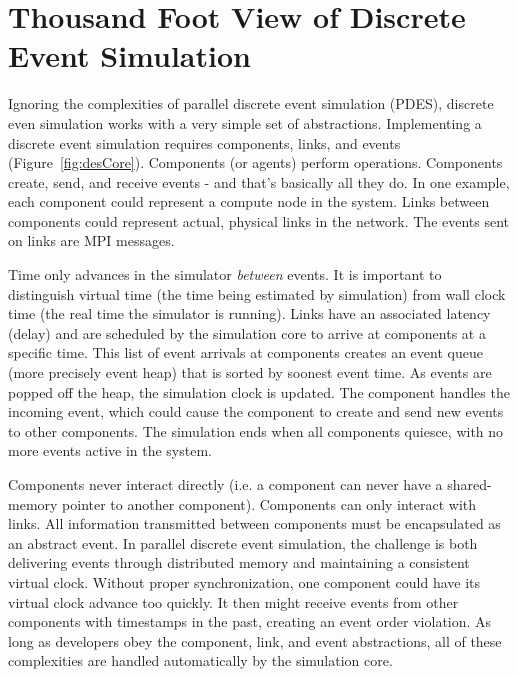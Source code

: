 \section{Thousand Foot View of Discrete Event Simulation}
\label{sec:thousandFoot}

Ignoring the complexities of parallel discrete event simulation (PDES), 
discrete even simulation works with a very simple set of abstractions.
Implementing a discrete event simulation requires components, links, and events (Figure~\ref{fig:desCore}).
Components (or agents) perform operations. Components create, send, and receive events - and that's basically all they do. 
In one example, each component could represent a compute node in the system.
Links between components could represent actual, physical links in the network.
The events sent on links are MPI messages.

Time only advances in the simulator \emph{between} events.
It is important to distinguish virtual time (the time being estimated by simulation) from wall clock time (the real time the simulator is running).
Links have an associated latency (delay) and are scheduled by the simulation core to arrive at components at a specific time.
This list of event arrivals at components creates an event queue (more precisely event heap) that is sorted by soonest event time.
As events are popped off the heap, the simulation clock is updated.
The component handles the incoming event, which could cause the component to create and send new events to other components.
The simulation ends when all components quiesce, with no more events active in the system.

Components never interact directly (i.e. a component can never have a shared-memory pointer to another component).
Components can only interact with links.
All information transmitted between components must be encapsulated as an abstract event.
In parallel discrete event simulation, the challenge is both delivering events through distributed memory and maintaining a consistent virtual clock.
Without proper synchronization, one component could have its virtual clock advance too quickly.
It then might receive events from other components with timestamps in the past,
creating an event order violation.
As long as developers obey the component, link, and event abstractions, all of these complexities are handled automatically by the simulation core.

